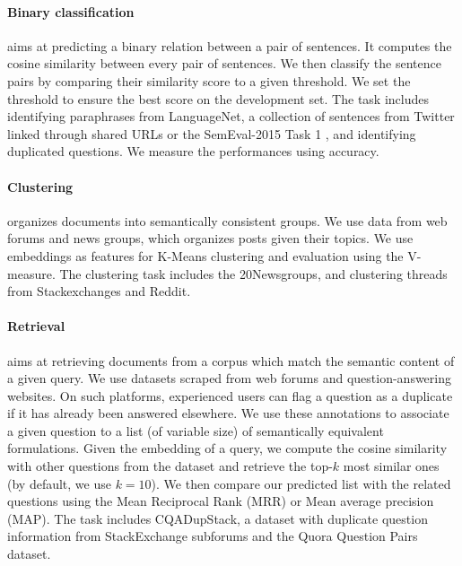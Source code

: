 \paragraph{Binary classification} aims at predicting a binary relation between a pair of sentences. It computes the cosine similarity between every pair of sentences. We then classify the sentence pairs by comparing their similarity score to a given threshold. We set the threshold to ensure the best score on the development set. The task includes identifying paraphrases from LanguageNet, a collection of sentences from Twitter linked through shared URLs  or the SemEval-2015 Task 1 , and identifying duplicated questions. We measure the performances using accuracy.

\paragraph{Clustering} organizes documents into semantically consistent groups. We use data from web forums and news groups, which organizes posts given their topics. We use embeddings as features for K-Means clustering and evaluation using the V-measure. The clustering task includes the 20Newsgroups, and clustering threads from Stackexchanges and Reddit. 

\paragraph{Retrieval} aims at retrieving documents from a corpus which match the semantic content of a given query. We use datasets scraped from web forums and question-answering websites. On such platforms, experienced users can flag a question as a duplicate if it has already been answered elsewhere. We use these annotations to associate a given question to a list (of variable size) of semantically equivalent formulations. Given the embedding of a query, we compute the cosine similarity with other questions from the dataset and retrieve the top-$k$ most similar ones (by default, we use $k=10$). We then compare our predicted list with the related questions using the Mean Reciprocal Rank (MRR) or Mean average precision (MAP). The task includes CQADupStack, a dataset with duplicate question information from StackExchange subforums and the Quora Question Pairs dataset.

